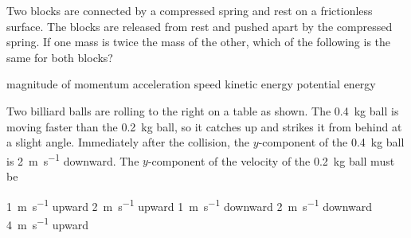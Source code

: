 \documentclass{../../../oss-classkick-exam}
\begin{document}
\begin{multicols*}{2}
\begin{questions}
    \question Two blocks are connected by a compressed spring and rest on a
    frictionless surface. The blocks are released from rest and pushed apart
    by the compressed spring. If one mass is twice the mass of the other,
    which of the following is the same for both blocks?
    \begin{choices}
      \choice magnitude of momentum
      \choice acceleration
      \choice speed
      \choice kinetic energy
      \choice potential energy
    \end{choices}
    \vspace{.15in}
    
    
    \question Two billiard balls are rolling to the right on a table as shown.
    The \SI{.4}{\kilo\gram} ball is moving faster than the \SI{.2}{\kilo\gram}
    ball, so it catches up and strikes it from behind at a slight angle.
    Immediately after the collision, the $y$-component of the
    \SI{.4}{\kilo\gram} ball is \SI{2}{\metre\per\second} downward.
    The $y$-component of the velocity of the \SI{.2}{\kilo\gram} ball must be
    \begin{center}
    \end{center}
    \begin{choices}
      \choice\SI{1}{\metre\per\second} upward
      \choice\SI{2}{\metre\per\second} upward
      \choice\SI{1}{\metre\per\second} downward
      \choice\SI{2}{\metre\per\second} downward
      \choice\SI{4}{\metre\per\second} upward
    \end{choices}


\end{questions}
\end{multicols*}
\end{document}
